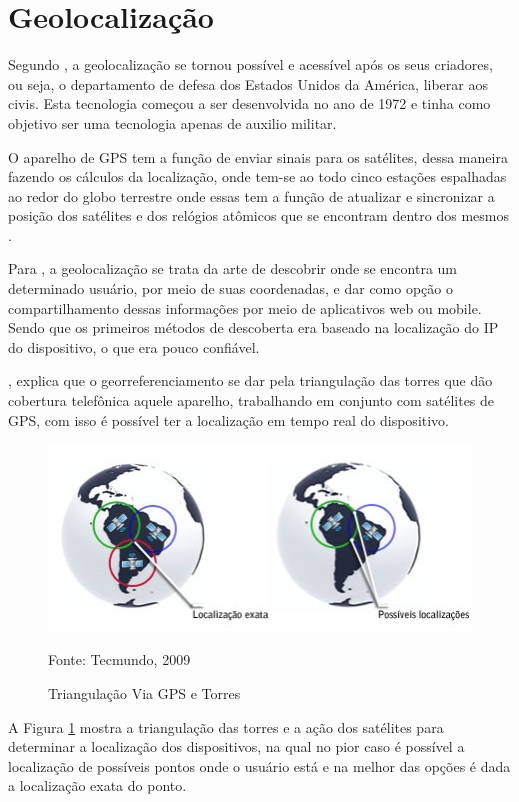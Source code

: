 	
\section{Geolocalização}
	Segundo , a geolocalização se tornou possível e acessível após os seus criadores, ou seja, o departamento de defesa dos Estados Unidos da América, liberar aos civis. Esta tecnologia começou a ser desenvolvida no ano de 1972 e tinha como objetivo ser uma tecnologia apenas de auxilio militar.
	
	O aparelho de GPS tem a função de enviar sinais para os satélites, dessa maneira fazendo os cálculos da localização, onde tem-se ao todo cinco estações espalhadas ao redor do globo terrestre onde essas tem a função de atualizar  e sincronizar a posição dos satélites e dos relógios atômicos que se encontram dentro dos mesmos \cite{gps:tecmundo}.
	
	Para , a geolocalização se trata da arte de descobrir onde se encontra um determinado usuário, por meio de suas coordenadas, e dar como opção o compartilhamento dessas informações por meio de aplicativos web ou mobile. Sendo que os primeiros métodos de descoberta era baseado na localização do IP do dispositivo, o que era pouco confiável.
	
	, explica que o georreferenciamento se dar pela triangulação das torres que dão cobertura telefônica aquele aparelho, trabalhando em conjunto com satélites de GPS, com isso é possível ter a localização em tempo real do dispositivo.
	
	\begin{figure}[H]
		\centering
		\includegraphics[scale=1]{imagens/triangulacao}
		\caption{Triangulação Via GPS e Torres}
		Fonte: Tecmundo, 2009
		\label{fig:triangulacao}
	\end{figure}
	
	A Figura \ref{fig:triangulacao} mostra a triangulação das torres e a ação dos satélites para determinar a localização dos dispositivos, na qual no pior caso é possível a localização de possíveis pontos onde o usuário está e na melhor das opções é dada a localização exata do ponto.
